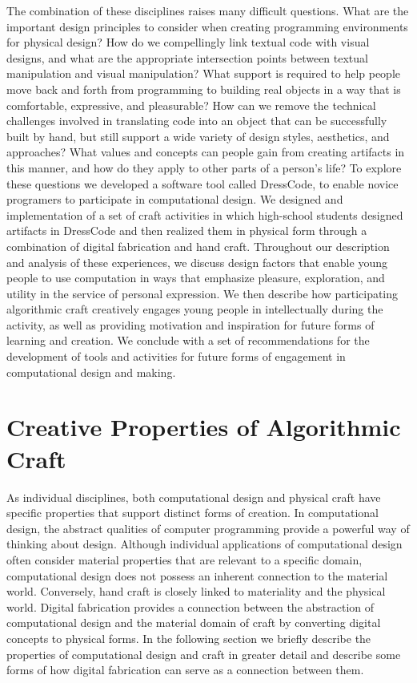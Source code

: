 \documentclass{sigchi}
\begin{document}
The combination of these disciplines raises many difficult questions. What are the important design principles to consider when creating programming environments for physical design? How do we compellingly link textual code with visual designs, and what are the appropriate intersection points between textual manipulation and visual manipulation? What support is required to help people move back and forth from programming to building real objects in a way that is comfortable, expressive, and pleasurable? How can we remove the technical challenges involved in translating code into an object that can be successfully built by hand, but still support a wide variety of design styles, aesthetics, and approaches? What values and concepts can people gain from creating artifacts in this manner, and how do they apply to other parts of a person's life? To explore these questions we developed a software tool called DressCode, to enable novice programers to participate in computational design. We designed and implementation of a set of craft activities in which high-school students designed artifacts in DressCode and then realized them in physical form through a combination of digital fabrication and hand craft. Throughout our description and analysis of these experiences, we discuss design factors that enable young people to use computation in ways that emphasize pleasure, exploration, and utility in the service of personal expression. We then describe how participating algorithmic craft creatively engages young people in intellectually during the activity, as well as providing motivation and inspiration for future forms of learning and creation. We conclude with a set of recommendations for the development of tools and activities for future forms of engagement in computational design and making.

\section{Creative Properties of Algorithmic Craft}
As individual disciplines, both computational design and physical craft have specific properties that support distinct forms of creation. In computational design, the abstract qualities of computer programming provide a powerful way of thinking about design. Although individual applications of computational design often consider material properties that are relevant to a specific domain, computational design does not possess an inherent connection to the material world. Conversely, hand craft is closely linked to materiality and the physical world. Digital fabrication provides a connection between the abstraction of computational design and the material domain of craft by converting digital concepts to physical forms. In the following section we briefly describe the properties of computational design and craft in greater detail and describe some forms of how digital fabrication can serve as a connection between them.
\end{document}
